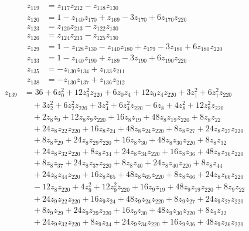 \begin{align*}
z_{119}&=z_{117} z_{212}-z_{118} z_{130}\\[3pt]
z_{120}&=1-z_{140} z_{170}+z_{169}-3z_{170}+6z_{170} z_{220}\\[3pt]
z_{123}&=z_{120} z_{213}-z_{122} z_{130}\\[3pt]
z_{126}&=z_{124} z_{213}-z_{125} z_{130}\\[3pt]
z_{129}&=1-z_{128} z_{130}-z_{140} z_{180}+z_{179}-3z_{180}+6z_{180} z_{220}\\[3pt]
z_{133}&=1-z_{140} z_{190}+z_{189}-3z_{190}+6z_{190} z_{220}\\[3pt]
z_{135}&=-z_{130} z_{134}+z_{133} z_{211}\\[3pt]
z_{138}&=-z_{130} z_{137}+z_{136} z_{212}
\end{align*}
\begin{align*}
z_{139}&=36+6z_{0}^{2}+12z_{0}^{2} z_{220}+6z_{0} z_{4}+12z_{0} z_{4} z_{220}+3z_{1}^{2}+6z_{1}^{2} z_{220}\\
&\quad{}+3z_{2}^{2}+6z_{2}^{2} z_{220}+3z_{4}^{2}+6z_{4}^{2} z_{220}-6z_{8}+4z_{8}^{2}+12z_{8}^{2} z_{220}\\
&\quad{}+2z_{8} z_{9}+12z_{8} z_{9} z_{220}+16z_{8} z_{19}+48z_{8} z_{19} z_{220}+8z_{8} z_{22}\\
&\quad{}+24z_{8} z_{22} z_{220}+16z_{8} z_{24}+48z_{8} z_{24} z_{220}+8z_{8} z_{27}+24z_{8} z_{27} z_{220}\\
&\quad{}+8z_{8} z_{29}+24z_{8} z_{29} z_{220}+16z_{8} z_{30}+48z_{8} z_{30} z_{220}+8z_{8} z_{32}\\
&\quad{}+24z_{8} z_{32} z_{220}+8z_{8} z_{34}+24z_{8} z_{34} z_{220}+16z_{8} z_{36}+48z_{8} z_{36} z_{220}\\
&\quad{}+8z_{8} z_{37}+24z_{8} z_{37} z_{220}+8z_{8} z_{40}+24z_{8} z_{40} z_{220}+8z_{8} z_{44}\\
&\quad{}+24z_{8} z_{44} z_{220}+16z_{8} z_{65}+48z_{8} z_{65} z_{220}+8z_{8} z_{66}+24z_{8} z_{66} z_{220}\\
&\quad{}-12z_{8} z_{220}+4z_{9}^{2}+12z_{9}^{2} z_{220}+16z_{9} z_{19}+48z_{9} z_{19} z_{220}+8z_{9} z_{22}\\
&\quad{}+24z_{9} z_{22} z_{220}+16z_{9} z_{24}+48z_{9} z_{24} z_{220}+8z_{9} z_{27}+24z_{9} z_{27} z_{220}\\
&\quad{}+8z_{9} z_{29}+24z_{9} z_{29} z_{220}+16z_{9} z_{30}+48z_{9} z_{30} z_{220}+8z_{9} z_{32}\\
&\quad{}+24z_{9} z_{32} z_{220}+8z_{9} z_{34}+24z_{9} z_{34} z_{220}+16z_{9} z_{36}+48z_{9} z_{36} z_{220}\\

\end{align*}
